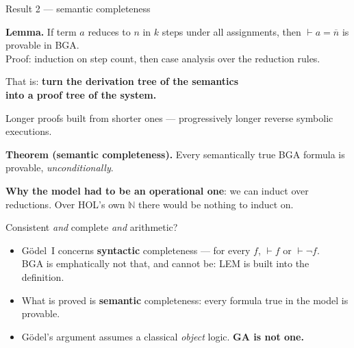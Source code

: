 \documentclass[aspectratio=169,11pt]{beamer}
\newcommand{\key}[1]{{\color{accent}\textbf{#1}}}
\begin{document}
\begin{frame}{Result 2 --- semantic completeness}
  \vfill
  \begin{center}\small
    \textbf{Lemma.} If term $a$ reduces to $n$ in $k$ steps under all assignments,
    then $\vdash a = \overline{n}$ is provable in BGA.\\
    {\footnotesize Proof: induction on step count, then case analysis over the reduction rules.}
  \end{center}
  \vfill
  \pause
  \begin{center}\large
    That is: \key{turn the derivation tree of the semantics\\ into a proof tree of the system.}
  \end{center}
  \begin{center}\small
    Longer proofs built from shorter ones --- progressively longer reverse
    symbolic executions.
  \end{center}
  \vfill
  \pause
  \begin{center}
    \textbf{Theorem (semantic completeness).} Every semantically true BGA formula
    is provable, \emph{unconditionally}.
  \end{center}
  \vfill
  \pause
  \begin{center}\small
    \key{Why the model had to be an operational one}: we can induct over reductions.
    Over HOL's own $\mathbb{N}$ there would be nothing to induct on.
  \end{center}
\end{frame}

\begin{frame}{Consistent \emph{and} complete \emph{and} arithmetic?}
  \vfill
  \begin{itemize}\itemsep0.8em
    \item G\"odel~I concerns \key{syntactic} completeness --- for every $f$,
          $\vdash f$ or $\vdash \neg f$.\\
          {\small BGA is emphatically not that, and cannot be: LEM is built into the definition.}
    \item What is proved is \key{semantic} completeness: every formula true in the
          model is provable.
    \item G\"odel's argument assumes a classical \emph{object} logic.
          \key{GA is not one.}
  \end{itemize}
  \vfill
\end{frame}
\end{document}
